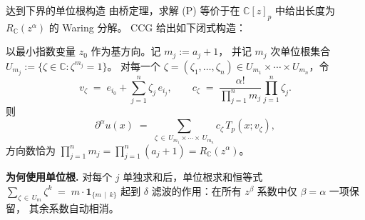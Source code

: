 \documentclass[10pt,aspectratio=169]{beamer}
\newcommand{\C}{\mathbb{C}}
\newcommand{\Tp}{T_p}
\newcommand{\dal}{\partial^{\alpha}}
\begin{document}
\begin{frame}{达到下界的单位根构造}
  由桥定理，求解 (P) 等价于在 $\C[z]_p$ 中给出长度为 $R_\C(z^\alpha)$ 的 Waring 分解。
  CCG 给出如下闭式构造：

  \medskip
  以最小指数变量 $z_0$ 作为基方向。记 $m_j:=a_j+1$，
  并记 $m_j$ 次单位根集合 $U_{m_j}:=\{\zeta\in\C : \zeta^{m_j}=1\}$。
  对每一个 $\zeta=(\zeta_1,\dots,\zeta_n)\in U_{m_1}\times\cdots\times U_{m_n}$，令
  \[
    v_{\zeta} \;=\; e_{i_0} + \sum_{j=1}^{n}\zeta_j\,e_{i_j},
    \qquad
    c_{\zeta} \;=\; \frac{\alpha!}{\prod_{j=1}^{n}m_j}\prod_{j=1}^{n}\zeta_j.
  \]
  则
  \[
    \dal u(x)
    \;=\; \sum_{\zeta\,\in\, U_{m_1}\!\times\cdots\times\, U_{m_n}}\!\!
          c_{\zeta}\,\Tp(x;v_{\zeta}),
  \]
  方向数恰为 $\prod_{j=1}^{n}m_j = \prod_{j=1}^{n}(a_j+1) = R_\C(z^\alpha)$。

  \medskip
  \textbf{为何使用单位根.}\;
  对每个 $j$ 单独求和后，单位根求和恒等式
  $\displaystyle\sum_{\zeta\,\in\, U_m}\zeta^{k}\;=\;m\cdot\mathbf{1}_{\{m\,\mid\, k\}}$
  起到 $\delta$ 滤波的作用：在所有 $z^\beta$ 系数中仅 $\beta=\alpha$ 一项保留，
  其余系数自动相消。
\end{frame}
\end{document}
